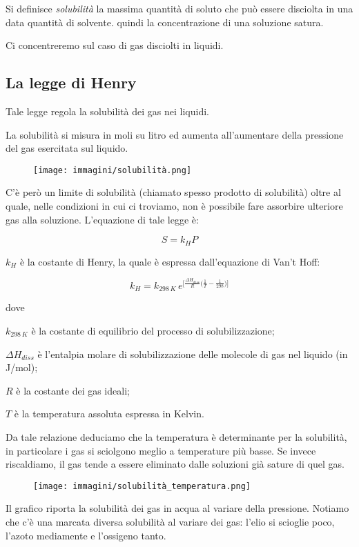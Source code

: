 Si definisce \textit{solubilità} la massima quantità di soluto che può essere disciolta in una data quantità di
solvente. \E quindi la concentrazione di una soluzione satura.

Ci concentreremo sul caso di gas disciolti in liquidi.
\subsection{La legge di Henry}
Tale legge regola la solubilità dei gas nei liquidi.

La solubilità si misura in moli su litro ed aumenta all'aumentare della pressione del gas esercitata sul liquido.
\begin{figure}[htp]
    \centering
    \texttt{[image: immagini/solubilità.png]}
\end{figure}

C'è però un limite di solubilità (chiamato spesso prodotto di solubilità) oltre al quale, nelle condizioni in cui ci troviamo, non è possibile fare assorbire ulteriore gas alla soluzione.
L'equazione di tale legge è:

$$S=k_HP$$

$k_H$ è la costante di Henry, la quale è espressa dall'equazione di Van't Hoff:

$$k_H=k_{298 \, K} \, e^{\big[\frac{\Delta H_{diss}}{R} \big( \frac{1}{T} - \frac{1}{298} \big) \big]}$$

dove

$k_{298 \, K}$ è la costante di equilibrio del processo di solubilizzazione;

$\Delta H_{diss}$ è l'entalpia molare di solubilizzazione delle molecole di gas nel liquido (in J/mol);

$R$ è la costante dei gas ideali;

$T$ è la temperatura assoluta espressa in Kelvin.

Da tale relazione deduciamo che la temperatura è determinante per la solubilità, in particolare i gas si sciolgono meglio a temperature più basse. Se invece riscaldiamo, il gas tende a essere eliminato dalle soluzioni già sature di quel gas.

\begin{minipage}{0.5 \textwidth}
    \begin{figure}[H]
        \centering
        \texttt{[image: immagini/solubilità\_temperatura.png]}
    \end{figure}
\end{minipage}
\begin{minipage}{0.4 \textwidth}
    \vspace{0.8cm}Il grafico riporta la solubilità dei gas in acqua al variare della pressione. Notiamo che c'è una marcata diversa solubilità al variare dei gas: l'elio si scioglie poco, l'azoto mediamente e l'ossigeno tanto.
\end{minipage}

